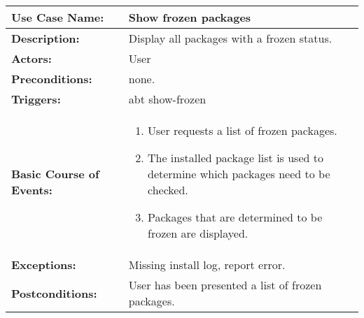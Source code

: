 
\begin{tabularx}{\linewidth}{|l|X|}
\hline
\textbf{Use Case Name:} & \textbf{Show frozen packages} \\
\hline
\textbf{Description:} & Display all packages with a frozen status. \\
\hline
\textbf{Actors:} & User \\
\hline
\textbf{Preconditions:} & none. \\
\hline
\textbf{Triggers:} & abt show-frozen \\
\hline
\textbf{Basic Course of Events:} & 
\begin{minipage}{\linewidth} 
  \vspace{0.05em}
  \begin{enumerate}
    \item User requests a list of frozen packages.
    \item The installed package list is used to determine which packages need to be checked.
    \item Packages that are determined to be frozen are displayed.
  \end{enumerate}
  \vspace{0.05em}
\end{minipage}
\\
\hline 
\textbf{Exceptions:} & Missing install log, report error. \\
\hline 
\textbf{Postconditions:} &
User has been presented a list of frozen packages. \\
\hline
\end{tabularx}



